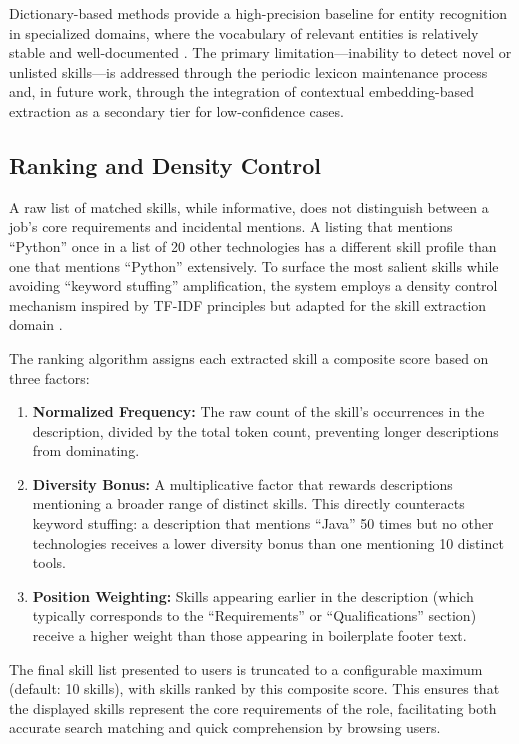 Dictionary-based methods provide a high-precision baseline for entity recognition in specialized domains, where the vocabulary of relevant entities is relatively stable and well-documented \cite{nadeau2007survey}. The primary limitation—inability to detect novel or unlisted skills—is addressed through the periodic lexicon maintenance process and, in future work, through the integration of contextual embedding-based extraction as a secondary tier for low-confidence cases.

\subsection{Ranking and Density Control}

A raw list of matched skills, while informative, does not distinguish between a job's core requirements and incidental mentions. A listing that mentions ``Python'' once in a list of 20 other technologies has a different skill profile than one that mentions ``Python'' extensively. To surface the most salient skills while avoiding ``keyword stuffing'' amplification, the system employs a density control mechanism inspired by TF-IDF principles but adapted for the skill extraction domain \cite{giabelli2021skills, bhola2020retrieving}.

The ranking algorithm assigns each extracted skill a composite score based on three factors:

\begin{enumerate}
    \item \textbf{Normalized Frequency:} The raw count of the skill's occurrences in the description, divided by the total token count, preventing longer descriptions from dominating.
    \item \textbf{Diversity Bonus:} A multiplicative factor that rewards descriptions mentioning a broader range of distinct skills. This directly counteracts keyword stuffing: a description that mentions ``Java'' 50 times but no other technologies receives a lower diversity bonus than one mentioning 10 distinct tools.
    \item \textbf{Position Weighting:} Skills appearing earlier in the description (which typically corresponds to the ``Requirements'' or ``Qualifications'' section) receive a higher weight than those appearing in boilerplate footer text.
\end{enumerate}

The final skill list presented to users is truncated to a configurable maximum (default: 10 skills), with skills ranked by this composite score. This ensures that the displayed skills represent the core requirements of the role, facilitating both accurate search matching and quick comprehension by browsing users.

